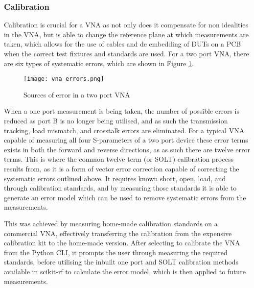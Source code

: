 \subsubsection{Calibration}
Calibration is crucial for a VNA as not only does it compensate for non idealities in the VNA, but is able to change the reference plane at which measurements are taken, which allows for the use of cables and de embedding of DUTs on a PCB when the correct test fixtures and standards are used. For a two port VNA, there are six types of systematic errors, \cite{keysight_vna_cal} which are shown in Figure \ref{fig:vna_error}.
\begin{figure}[H]
	\centering
	\texttt{[image: vna\_errors.png]}
	\caption{Sources of error in a two port VNA}
	\label{fig:vna_error}
\end{figure}
When a one port measurement is being taken, the number of possible errors is reduced as port B is no longer being utilised, and as such the transmission tracking, load mismatch, and crosstalk errors are eliminated. For a typical VNA capable of measuring all four S-parameters of a two port device these error terms exists in both the forward and reverse directions, as as such there are twelve error terms. This is where the common twelve term (or SOLT) calibration process results from, as it is a form of vector error correction capable of correcting the systematic errors outlined above. It requires known short, open, load, and through calibration standards, and by measuring those standards it is able to generate an error model which can be used to remove systematic errors from the measurements. 

This was achieved by measuring home-made calibration standards on a commercial VNA, effectively transferring the calibration from the expensive calibration kit to the home-made version. After selecting to calibrate the VNA from the Python CLI, it prompts the user through measuring the required standards, before utilising the inbuilt one port and SOLT calibration methods available in scikit-rf to calculate the error model, which is then applied to future measurements.



